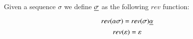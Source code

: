 
\begin{definition}
  Given a sequence $\sigma$ we define $\underline{\sigma}$ as the
  following $rev$ function:

  \[
    rev(\alpha\sigma) = rev(\sigma)\underline{\alpha}
  \]
  \[
    rev(\varepsilon) = \varepsilon
  \]
  
\end{definition}

